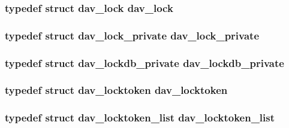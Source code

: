\subsubsection[{\texorpdfstring{dav\+\_\+lock}{dav_lock}}]{\setlength{\rightskip}{0pt plus 5cm}typedef struct {\bf dav\+\_\+lock}  {\bf dav\+\_\+lock}}\hypertarget{group__MOD__DAV_ga1cff82155446038cb3433376c78eb085}{}\label{group__MOD__DAV_ga1cff82155446038cb3433376c78eb085}
\subsubsection[{\texorpdfstring{dav\+\_\+lock\+\_\+private}{dav_lock_private}}]{\setlength{\rightskip}{0pt plus 5cm}typedef struct {\bf dav\+\_\+lock\+\_\+private} {\bf dav\+\_\+lock\+\_\+private}}\hypertarget{group__MOD__DAV_gaea2b96e0ff557afc868d5fa3894f6b9d}{}\label{group__MOD__DAV_gaea2b96e0ff557afc868d5fa3894f6b9d}
\subsubsection[{\texorpdfstring{dav\+\_\+lockdb\+\_\+private}{dav_lockdb_private}}]{\setlength{\rightskip}{0pt plus 5cm}typedef struct {\bf dav\+\_\+lockdb\+\_\+private} {\bf dav\+\_\+lockdb\+\_\+private}}\hypertarget{group__MOD__DAV_ga1a051de73610d45ef4200319270c5dae}{}\label{group__MOD__DAV_ga1a051de73610d45ef4200319270c5dae}
\subsubsection[{\texorpdfstring{dav\+\_\+locktoken}{dav_locktoken}}]{\setlength{\rightskip}{0pt plus 5cm}typedef struct {\bf dav\+\_\+locktoken} {\bf dav\+\_\+locktoken}}\hypertarget{group__MOD__DAV_ga97f63d90aa669c1fa6551842d3c803e3}{}\label{group__MOD__DAV_ga97f63d90aa669c1fa6551842d3c803e3}
\subsubsection[{\texorpdfstring{dav\+\_\+locktoken\+\_\+list}{dav_locktoken_list}}]{\setlength{\rightskip}{0pt plus 5cm}typedef struct {\bf dav\+\_\+locktoken\+\_\+list}  {\bf dav\+\_\+locktoken\+\_\+list}}\hypertarget{group__MOD__DAV_ga88eab7a69068f5595f82210267250d7e}{}\label{group__MOD__DAV_ga88eab7a69068f5595f82210267250d7e}
